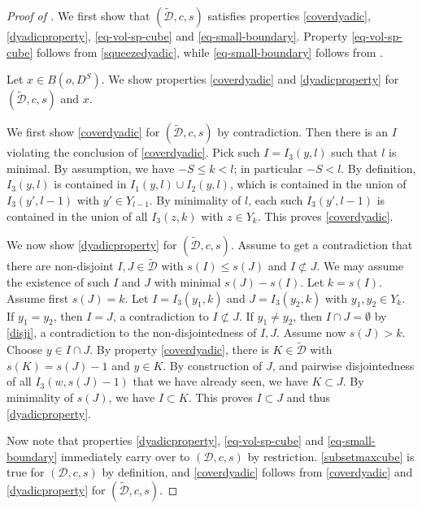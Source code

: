 \begin{proof}[Proof of ]
\leanok
We first show that $(\tilde{\mathcal{D}},c,s)$ satisfies properties \eqref{coverdyadic}, \eqref{dyadicproperty}, \eqref{eq-vol-sp-cube} and \eqref{eq-small-boundary}. Property \eqref{eq-vol-sp-cube}
follows from \eqref{squeezedyadic}, while \eqref{eq-small-boundary} follows from .

Let $x\in B(o, D^S)$.
We show properties
\eqref{coverdyadic} and
\eqref{dyadicproperty}
for $(\tilde{\mathcal{D}},c,s)$ and $x$.

We first show \eqref{coverdyadic} for $(\tilde{\mathcal{D}},c,s)$ by contradiction. Then there is an $I$ violating the conclusion of
\eqref{coverdyadic}. Pick such $I=I_3(y,l)$ such that $l$ is minimal.
{By assumption, we have $-S\le k<l$; in particular $-S<l$}.
By definition, $I_3(y, l)$ is contained in $I_1(y, l)\cup I_2(y, l)$, which is contained in the union of $I_3(y',l-1)$ with $y'\in Y_{l-1}$.
By minimality of $l$, each such $I_3(y',l-1)$ is contained in the union of
all $I_3(z,k)$ with $z\in Y_k$. This proves \eqref{coverdyadic}.

We now show \eqref{dyadicproperty} for $(\tilde{\mathcal{D}},c,s)$. Assume to get a contradiction that
there are non-disjoint $I, J\in \tilde{\mathcal{D}}$ with $s(I)\le s(J)$
and $I \not \subset J$. We may assume the existence of such $I$ and $J$ with minimal
$s(J)-s(I)$. Let $k=s(I)$. Assume first $s(J)=k$. Let $I=I_3(y_1,k)$ and $J=I_3(y_2,k)$ with $y_1,y_2\in Y_k$.
If $y_1=y_2$, then $I=J$, a contradiction to $I\not \subset J$.
If $y_1\neq y_2$, then $I\cap J=\emptyset$ by \eqref{disji}, a contradiction to the non-disjointedness of $I,J$.
Assume now $s(J)>k$. Choose $y\in I\cap J$. By property \eqref{coverdyadic},
there is $K\in \tilde{\mathcal{D}}$ with $s(K)=s(J)-1$ and $y\in K$. By construction
of $J$, and pairwise disjointedness of all $I_3(w,s(J)-1)$ that we have already seen,
we have $K\subset J$. By minimality of $s(J)$, we have $I\subset K$.
This proves $I\subset J$ and thus \eqref{dyadicproperty}.

Now note that properties \eqref{dyadicproperty}, \eqref{eq-vol-sp-cube} and \eqref{eq-small-boundary} immediately carry over to $(\mathcal{D},c, s)$ by restriction. \eqref{subsetmaxcube} is true for $(\mathcal{D}, c, s)$ by definition, and \eqref{coverdyadic} follows from \eqref{coverdyadic} and \eqref{dyadicproperty} for $(\tilde{\mathcal{D}}, c, s)$.
\end{proof}

